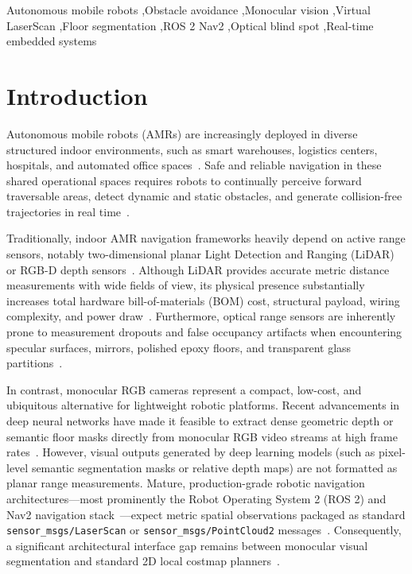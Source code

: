 \documentclass[preprint,12pt]{elsarticle}
\begin{document}
\begin{frontmatter}
\begin{keyword}
Autonomous mobile robots \sep Obstacle avoidance \sep Monocular vision \sep Virtual LaserScan \sep Floor segmentation \sep ROS 2 Nav2 \sep Optical blind spot \sep Real-time embedded systems
\end{keyword}

\end{frontmatter}


\section{Introduction}
\label{sec:introduction}

Autonomous mobile robots (AMRs) are increasingly deployed in diverse structured indoor environments, such as smart warehouses, logistics centers, hospitals, and automated office spaces~\cite{gvrnextgenerationtechnologiesresearchteam_2026_autonomous,liu_2024_a}. Safe and reliable navigation in these shared operational spaces requires robots to continually perceive forward traversable areas, detect dynamic and static obstacles, and generate collision-free trajectories in real time~\cite{macenski_2020_the,yang_2019_semantic}.

Traditionally, indoor AMR navigation frameworks heavily depend on active range sensors, notably two-dimensional planar Light Detection and Ranging (LiDAR) or RGB-D depth sensors~\cite{li_2020_lidar,yusuf_2022_iotbased}. Although LiDAR provides accurate metric distance measurements with wide fields of view, its physical presence substantially increases total hardware bill-of-materials (BOM) cost, structural payload, wiring complexity, and power draw~\cite{liu_2024_a}. Furthermore, optical range sensors are inherently prone to measurement dropouts and false occupancy artifacts when encountering specular surfaces, mirrors, polished epoxy floors, and transparent glass partitions~\cite{deepthadamodaran_2023_experimental,yang_2011_on,tibebu_2021_lidarbased,sajjan_2020_clear,singh_2019_multidata}.

In contrast, monocular RGB cameras represent a compact, low-cost, and ubiquitous alternative for lightweight robotic platforms. Recent advancements in deep neural networks have made it feasible to extract dense geometric depth or semantic floor masks directly from monocular RGB video streams at high frame rates~\cite{shariqfarooqbhat_2021_adabins,ranftl_2021_vision,ultralytics_2024_ultralytics}. However, visual outputs generated by deep learning models (such as pixel-level semantic segmentation masks or relative depth maps) are not formatted as planar range measurements. Mature, production-grade robotic navigation architectures---most prominently the Robot Operating System 2 (ROS 2) and Nav2 navigation stack~\cite{macenski_2022_robot,macenski_2023_from}---expect metric spatial observations packaged as standard \texttt{sensor\_msgs/LaserScan} or \texttt{sensor\_msgs/PointCloud2} messages~\cite{openrobotics_sensor_msgslaserscan}. Consequently, a significant architectural interface gap remains between monocular visual segmentation and standard 2D local costmap planners~\cite{openrobotics_2020_depthimage_to_laserscan,opennavigationllc_2023_costmap}.
\end{document}
